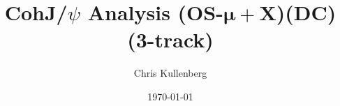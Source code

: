 \title{CohJ/$\psi$ Analysis (\textbf{OS}-$\boldsymbol{\mu+}$\textbf{X})(\textbf{DC})(\textbf{3-track})}
\author{Chris Kullenberg}
\date{\today}
